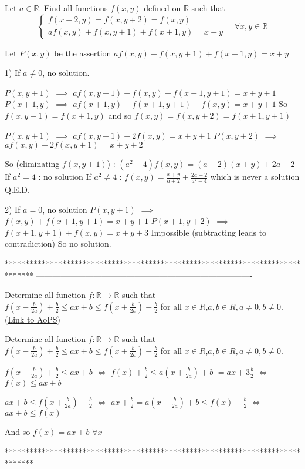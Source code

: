 \begin{solution}
	\begin{tcolorbox}Let $a\in\mathbb R$. Find all functions  $f(x,y)$ defined on $\mathbb R$ such that \[\begin{cases}f(x+2,y)=f(x,y+2)=f(x,y)\\af(x,y)+f(x,y+1)+f(x+1,y)=x+y\end{cases}\quad \forall x,y\in\mathbb R\]\end{tcolorbox}
Let $P(x,y)$ be the assertion $af(x,y)+f(x,y+1)+f(x+1,y)=x+y$

1) If $a\ne 0$, no solution.

$P(x,y+1)$ $\implies$ $af(x,y+1)+f(x,y)+f(x+1,y+1)=x+y+1$
$P(x+1,y)$ $\implies$ $af(x+1,y)+f(x+1,y+1)+f(x,y)=x+y+1$
So $f(x,y+1)=f(x+1,y)$ and so $f(x,y)=f(x,y+2)=f(x+1,y+1)$

$P(x,y+1)$ $\implies$ $af(x,y+1)+2f(x,y)=x+y+1$
$P(x,y+2)$ $\implies$ $af(x,y)+2f(x,y+1)=x+y+2$

So (eliminating $f(x,y+1)$) : $(a^2-4)f(x,y)=(a-2)(x+y)+2a-2$
If $a^2=4$ : no solution
If $a^2\ne 4$ : $f(x,y)=\frac{x+y}{a+2}+\frac{2a-2}{a^2-4}$ which is never a solution
Q.E.D.


2) If $a=0$, no solution
$P(x,y+1)$ $\implies$ $f(x,y)+f(x+1,y+1)=x+y+1$
$P(x+1,y+2)$ $\implies$ $f(x+1,y+1)+f(x,y)=x+y+3$
Impossible (subtracting leads to contradiction)
So no solution.
\end{solution}
*******************************************************************************
-------------------------------------------------------------------------------

\begin{problem}
	Determine all function $f: \mathbb{R}\to\mathbb{R}$ such that $f(x-\frac{b}{2a})+\frac{b}{2}{\leq}ax+b{\leq}f(x+\frac{b}{2a})-\frac{b}{2}$ for all $x{\in}R$,$a,b{{\in}R, a{\neq}0,b{\neq}0}$.
	\flushright \href{https://artofproblemsolving.com/community/c6h569438}{(Link to AoPS)}
\end{problem}



\begin{solution}
	\begin{tcolorbox}Determine all function $f: \mathbb{R}\to\mathbb{R}$ such that $f(x-\frac{b}{2a})+\frac{b}{2}{\leq}ax+b{\leq}f(x+\frac{b}{2a})-\frac{b}{2}$ for all $x{\in}R$,$a,b{{\in}R, a{\neq}0,b{\neq}0}$.\end{tcolorbox}
$f(x-\frac b{2a})+\frac b2\le ax+b$ $\iff$ $f(x)+\frac b2\le a(x+\frac b{2a})+b$ $=ax+3\frac b2$ $\iff$ $f(x)\le ax+b$

$ax+b\le f(x+\frac b{2a})-\frac b2$ $\iff$ $ax+\frac b2=a(x-\frac b{2a})+b\le f(x)-\frac b2$ $\iff$ $ax+b\le f(x)$

And so $\boxed{f(x)=ax+b}$ $\forall x$
\end{solution}
*******************************************************************************
-------------------------------------------------------------------------------

